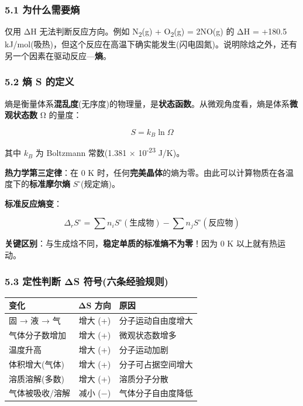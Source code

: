\subsubsection{5.1 为什么需要熵}\label{ux4e3aux4ec0ux4e48ux9700ux8981ux71b5}

仅用 ΔH 无法判断反应方向。例如 N\textsubscript{2}(g) + O\textsubscript{2}(g) = 2NO(g) 的 ΔH = +180.5 kJ/mol(吸热)，但这个反应在高温下确实能发生(闪电固氮)。说明除焓之外，还有另一个因素在驱动反应---\textbf{熵}。

\subsubsection{5.2 熵 S 的定义}\label{ux71b5-s-ux7684ux5b9aux4e49}

熵是衡量体系\textbf{混乱度}(无序度)的物理量，是\textbf{状态函数}。从微观角度看，熵是体系\textbf{微观状态数} Ω 的量度：

\[
S = k_B \ln \Omega
\]

其中 \(k_B\) 为 Boltzmann 常数(1.381 × 10\textsuperscript{-23} J/K)。

\textbf{热力学第三定律}：在 0 K 时，任何\textbf{完美晶体}的熵为零。由此可以计算物质在各温度下的\textbf{标准摩尔熵} \(S^\circ\)(规定熵)。

\textbf{标准反应熵变}：

\[
\Delta_r S^\circ = \sum n_i S^\circ(\text{生成物}) - \sum n_j S^\circ(\text{反应物})
\]

\textbf{关键区别}：与生成焓不同，\textbf{稳定单质的标准熵不为零}！因为 0 K 以上就有热运动。

\subsubsection{5.3 定性判断 ΔS 符号(六条经验规则)}\label{ux5b9aux6027ux5224ux65ad-ux3b4s-ux7b26ux53f7ux516dux6761ux7ecfux9a8cux89c4ux5219}

{\def\LTcaptype{none} %
\begin{longtable}[]{@{}lcl@{}}
\toprule\noalign{}
变化 & ΔS 方向 & 原因 \\
\midrule\noalign{}
\endhead
\bottomrule\noalign{}
\endlastfoot
固 → 液 → 气 & 增大 (+) & 分子运动自由度增大 \\
气体分子数增加 & 增大 (+) & 微观状态数增多 \\
温度升高 & 增大 (+) & 分子运动加剧 \\
体积增大(气体) & 增大 (+) & 分子可占据空间增大 \\
溶质溶解(多数) & 增大 (+) & 溶质分子分散 \\
气体被吸收/溶解 & 减小 (−) & 气体分子自由度降低 \\
\end{longtable}
}

